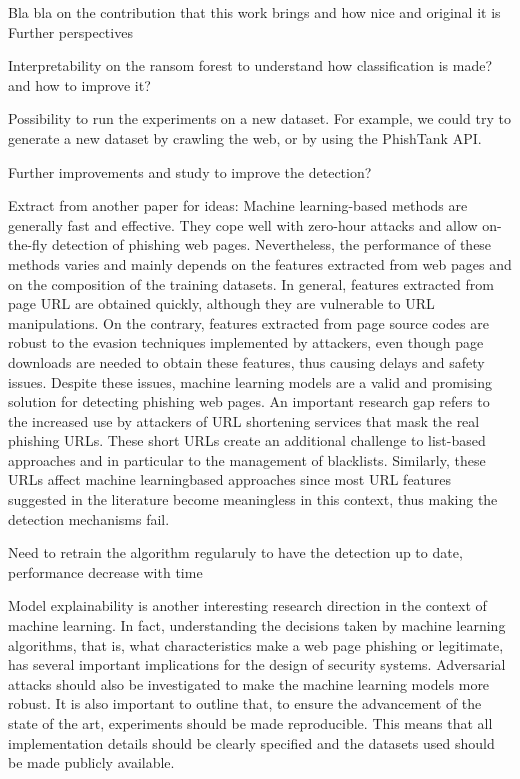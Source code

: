 \documentclass{article}
\begin{document}
    Bla bla on the contribution that this work brings and how nice and original it is
    Further perspectives

    Interpretability on the ransom forest to understand how classification is made? and how to improve it?

    Possibility to run the experiments on a new dataset.
    For example, we could try to generate a new dataset by crawling the web, or by using the PhishTank API.

    Further improvements and study to improve the detection?

    Extract from another paper for ideas:
    Machine learning-based methods are generally fast and
    effective. They cope well with zero-hour attacks and allow
    on-the-fly detection of phishing web pages. Nevertheless, the
    performance of these methods varies and mainly depends on
    the features extracted from web pages and on the composition
    of the training datasets. In general, features extracted from
    page URL are obtained quickly, although they are vulnerable
    to URL manipulations. On the contrary, features extracted
    from page source codes are robust to the evasion techniques
    implemented by attackers, even though page downloads are
    needed to obtain these features, thus causing delays and safety
    issues. Despite these issues, machine learning models are
    a valid and promising solution for detecting phishing web
    pages.
    An important research gap refers to the increased use by
    attackers of URL shortening services that mask the real phishing
    URLs. These short URLs create an additional challenge
    to list-based approaches and in particular to the management
    of blacklists. Similarly, these URLs affect machine learningbased
    approaches since most URL features suggested in the
    literature become meaningless in this context, thus making
    the detection mechanisms fail.

    Need to retrain the algorithm regularuly to have the detection up to date, performance decrease with time

    Model explainability is another interesting research direction
    in the context of machine learning. In fact, understanding
    the decisions taken by machine learning algorithms, that is,
    what characteristics make a web page phishing or legitimate,
    has several important implications for the design of security
    systems. Adversarial attacks should also be investigated to
    make the machine learning models more robust.
    It is also important to outline that, to ensure the advancement
    of the state of the art, experiments should be made reproducible.
    This means that all implementation details should
    be clearly specified and the datasets used should be made
    publicly available.
\end{document}
